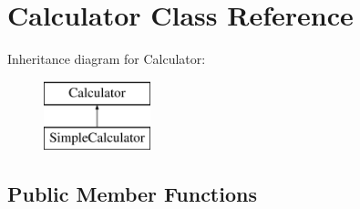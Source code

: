 \hypertarget{class_calculator}{}\section{Calculator Class Reference}
\label{class_calculator}
Inheritance diagram for Calculator\+:\begin{figure}[H]
\begin{center}
\leavevmode
\includegraphics[height=2.000000cm]{class_calculator}
\end{center}
\end{figure}
\subsection*{Public Member Functions}
